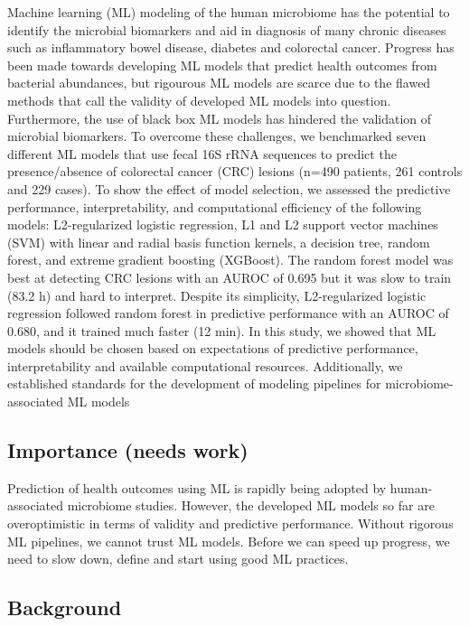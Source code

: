 \documentclass[11pt,]{article}
\begin{document}
Machine learning (ML) modeling of the human microbiome has the potential
to identify the microbial biomarkers and aid in diagnosis of many
chronic diseases such as inflammatory bowel disease, diabetes and
colorectal cancer. Progress has been made towards developing ML models
that predict health outcomes from bacterial abundances, but rigourous ML
models are scarce due to the flawed methods that call the validity of
developed ML models into question. Furthermore, the use of black box ML
models has hindered the validation of microbial biomarkers. To overcome
these challenges, we benchmarked seven different ML models that use
fecal 16S rRNA sequences to predict the presence/absence of colorectal
cancer (CRC) lesions (n=490 patients, 261 controls and 229 cases). To
show the effect of model selection, we assessed the predictive
performance, interpretability, and computational efficiency of the
following models: L2-regularized logistic regression, L1 and L2 support
vector machines (SVM) with linear and radial basis function kernels, a
decision tree, random forest, and extreme gradient boosting (XGBoost).
The random forest model was best at detecting CRC lesions with an AUROC
of 0.695 but it was slow to train (83.2 h) and hard to interpret.
Despite its simplicity, L2-regularized logistic regression followed
random forest in predictive performance with an AUROC of 0.680, and it
trained much faster (12 min). In this study, we showed that ML models
should be chosen based on expectations of predictive performance,
interpretability and available computational resources. Additionally, we
established standards for the development of modeling pipelines for
microbiome-associated ML models

\newpage

\subsection{Importance (needs work)}\label{importance-needs-work}

Prediction of health outcomes using ML is rapidly being adopted by
human-associated microbiome studies. However, the developed ML models so
far are overoptimistic in terms of validity and predictive performance.
Without rigorous ML pipelines, we cannot trust ML models. Before we can
speed up progress, we need to slow down, define and start using good ML
practices. \newpage

\subsection{Background}\label{background}
\end{document}
